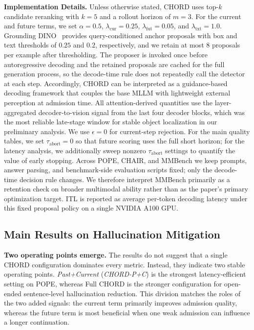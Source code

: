 \documentclass[sigconf,anonymous]{acmart}
\begin{document}
\noindent\textbf{Implementation Details.} Unless otherwise stated, CHORD uses top-$k$ candidate reranking with $k=5$ and a rollout horizon of $m=3$. For the current and future terms, we set $\alpha=0.5$, $\lambda_{\mathrm{cur}}=0.25$, $\lambda_{\mathrm{fut}}=0.05$, and $\lambda_{\mathrm{txt}}=1.0$. Grounding DINO~\cite{liu2023groundingdino} provides query-conditioned anchor proposals with box and text thresholds of $0.25$ and $0.2$, respectively, and we retain at most $8$ proposals per example after thresholding. The proposer is invoked once before autoregressive decoding and the retained proposals are cached for the full generation process, so the decode-time rule does not repeatedly call the detector at each step. Accordingly, CHORD can be interpreted as a guidance-based decoding framework that couples the base MLLM with lightweight external perception at admission time. All attention-derived quantities use the layer-aggregated decoder-to-vision signal from the last four decoder blocks, which was the most reliable late-stage window for stable object localization in our preliminary analysis. We use $\epsilon=0$ for current-step rejection. For the main quality tables, we set $\tau_{\mathrm{abort}}=0$ so that future scoring uses the full short horizon; for the latency analysis, we additionally sweep nonzero $\tau_{\mathrm{abort}}$ settings to quantify the value of early stopping. Across POPE, CHAIR, and MMBench we keep prompts, answer parsing, and benchmark-side evaluation scripts fixed; only the decode-time decision rule changes. We therefore interpret MMBench primarily as a retention check on broader multimodal ability rather than as the paper's primary optimization target. ITL is reported as average per-token decoding latency under this fixed proposal policy on a single NVIDIA A100 GPU.

\subsection{Main Results on Hallucination Mitigation}

\noindent\textbf{Two operating points emerge.} The results do not suggest that a single CHORD configuration dominates every metric. Instead, they indicate two stable operating points. \textit{Past+Current} (\textit{CHORD-P+C}) is the strongest latency-efficient setting on POPE, whereas Full CHORD is the stronger configuration for open-ended sentence-level hallucination reduction. This division matches the roles of the two added signals: the current term primarily improves admission quality, whereas the future term is most beneficial when one weak admission can influence a longer continuation.
\end{document}
